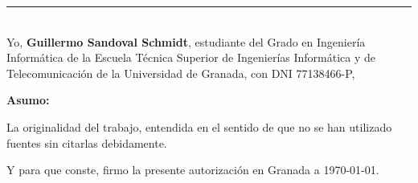 \thispagestyle{empty}

\noindent\rule[-1ex]{\textwidth}{1pt}\\[4.5ex]

Yo, \textbf{Guillermo Sandoval Schmidt}, estudiante del Grado en Ingeniería Informática de la Escuela Técnica Superior de Ingenierías Informática y de Telecomunicación de la Universidad de Granada, con DNI
77138466-P,

\vspace{0.5cm}

\textbf{Asumo:}

\vspace{0.5cm}

La originalidad del trabajo, entendida en el sentido de que no se han utilizado fuentes sin citarlas debidamente.

\vspace{0.5cm}

Y para que conste, firmo la presente autorización en Granada a \today.